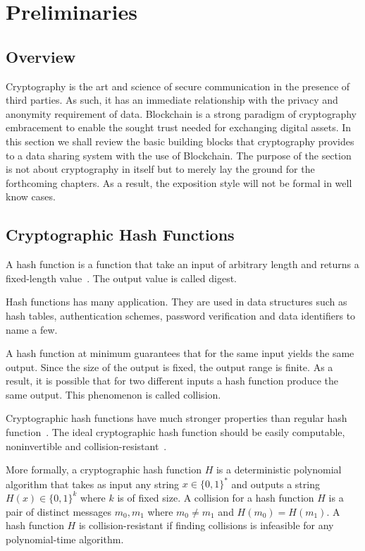 \chapter{Preliminaries}
\label{preliminaries}

\section{Overview}
\label{preliminaries:overview}

Cryptography is the art and science of secure communication in the presence of third parties. As such, it has an immediate relationship with the privacy and anonymity requirement of data. Blockchain is a strong paradigm of cryptography embracement to enable the sought trust needed for exchanging digital assets. In this section we shall review the basic building blocks that cryptography provides to a data sharing system with the use of Blockchain. The purpose of the section is not about cryptography in itself but to merely lay the ground for the forthcoming chapters. As a result, the exposition style will not be formal in well know cases.

\section{Cryptographic Hash Functions}
\label{preliminaries:hash}

A hash function is a function that take an input of arbitrary length and returns a fixed-length value~\cite{crypto_101,boneh_crypto,kiagias:crypto,Katz:2014:IMC:2700550}. The output value is called digest.

Hash functions has many application. They are used in data structures such as hash tables, authentication schemes, password verification and data identifiers to name a few.

A hash function at minimum guarantees that for the same input yields the same output. Since the size of the output is fixed, the output range is finite. As a result, it is possible that for two different inputs a hash function produce the same output. This phenomenon is called collision.

Cryptographic hash functions have much stronger properties than regular hash function~\cite{crypto_101}. The ideal cryptographic hash function should be easily computable, noninvertible and collision-resistant~\cite{Katz:2014:IMC:2700550, kiagias:crypto}.

More formally, a cryptographic hash function $H$ is a deterministic polynomial algorithm that takes as input any string $x \in \{0, 1\}^{*}$ and outputs a string $H(x) \in \{0, 1\}^{k}$ where $k$ is of fixed size. A collision for a hash function $H$ is a pair of distinct messages $m_0, m_1$ where $m_0 \neq m_1$ and $H(m_0) = H(m_1)$. A hash function $H$ is collision-resistant if finding collisions is infeasible for any polynomial-time algorithm.

